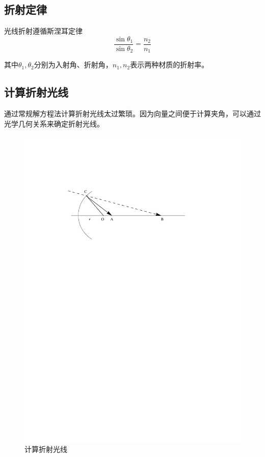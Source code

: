 \documentclass[10pt,twocolumn]{article}
\begin{document}
\subsection{\hei 折射定律}
光线折射遵循斯涅耳定律
\begin{equation}
\frac{\sin{\theta_1}}{\sin{\theta_2}}=\frac{n_2}{n_1}
\end{equation}

其中$\theta_1,\theta_2$分别为入射角、折射角，$n_1,n_2$表示两种材质的折射率。

\subsection{\hei 计算折射光线}
通过常规解方程法计算折射光线太过繁琐。因为向量之间便于计算夹角，可以通过光学几何关系来确定折射光线。

\begin{figure}[ht]
\centering
\includegraphics[scale=0.6]{fig10.pdf}
\caption{计算折射光线}
\end{figure}
\end{document}
